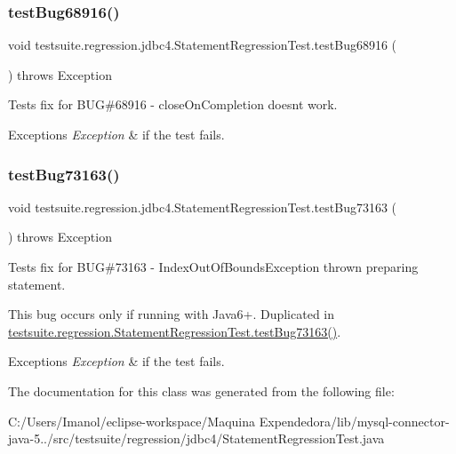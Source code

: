 \subsubsection{\texorpdfstring{test\+Bug68916()}{testBug68916()}}
{\footnotesize\ttfamily void testsuite.\+regression.\+jdbc4.\+Statement\+Regression\+Test.\+test\+Bug68916 (\begin{DoxyParamCaption}{ }\end{DoxyParamCaption}) throws Exception}

Tests fix for B\+UG\#68916 -\/ close\+On\+Completion doesn\textquotesingle{}t work.


\begin{DoxyExceptions}{Exceptions}
{\em Exception} & if the test fails. \\
\hline
\end{DoxyExceptions}
\mbox{\label{classtestsuite_1_1regression_1_1jdbc4_1_1_statement_regression_test_a787d86c71bb2f79af1594e419fd382d3}} 
\subsubsection{\texorpdfstring{test\+Bug73163()}{testBug73163()}}
{\footnotesize\ttfamily void testsuite.\+regression.\+jdbc4.\+Statement\+Regression\+Test.\+test\+Bug73163 (\begin{DoxyParamCaption}{ }\end{DoxyParamCaption}) throws Exception}

Tests fix for B\+UG\#73163 -\/ Index\+Out\+Of\+Bounds\+Exception thrown preparing statement.

This bug occurs only if running with Java6+. Duplicated in \mbox{\hyperlink{classtestsuite_1_1regression_1_1_statement_regression_test_ae5f07756a16c505fbd7fb497fcf9f601}{testsuite.\+regression.\+Statement\+Regression\+Test.\+test\+Bug73163()}}.


\begin{DoxyExceptions}{Exceptions}
{\em Exception} & if the test fails. \\
\hline
\end{DoxyExceptions}


The documentation for this class was generated from the following file\+:\begin{DoxyCompactItemize}
\item 
C\+:/\+Users/\+Imanol/eclipse-\/workspace/\+Maquina Expendedora/lib/mysql-\/connector-\/java-\/5../src/testsuite/regression/jdbc4/Statement\+Regression\+Test.\+java\end{DoxyCompactItemize}
